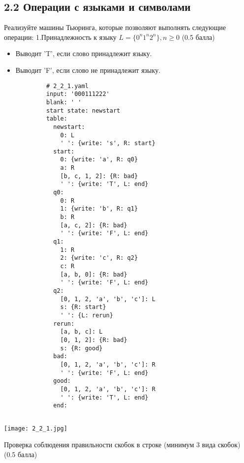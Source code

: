 \documentclass[a4paper,12pt]{article}
\begin{document}
        \subsection*{2.2 Операции с языками и символами}
        Реализуйте машины Тьюринга, которые позволяют выполнять следующие операции:\newline
        1.Принадлежность к языку $L = \{ 0^n1^n2^n \}, n \ge 0$ (0.5 балла)\newline
        \begin{itemize}
            \item Выводит 'T', если слово принадлежит языку.
            \item Выводит 'F', если слово не принадлежит языку.
        \end{itemize}
        \begin{verbatim}
            # 2_2_1.yaml
            input: '000111222'
            blank: ' '
            start state: newstart
            table:
              newstart:
                0: L
                ' ': {write: 's', R: start}
              start:
                0: {write: 'a', R: q0}
                a: R
                [b, c, 1, 2]: {R: bad}
                ' ': {write: 'T', L: end}
              q0:
                0: R
                1: {write: 'b', R: q1}
                b: R
                [a, c, 2]: {R: bad}
                ' ': {write: 'F', L: end}
              q1:
                1: R
                2: {write: 'c', R: q2}
                c: R
                [a, b, 0]: {R: bad}
                ' ': {write: 'F', L: end}
              q2:
                [0, 1, 2, 'a', 'b', 'c']: L
                s: {R: start}
                ' ': {L: rerun}
              rerun:
                [a, b, c]: L
                [0, 1, 2]: {R: bad}
                s: {R: good}
              bad:
                [0, 1, 2, 'a', 'b', 'c']: R
                ' ': {write: 'F', L: end}
              good:
                [0, 1, 2, 'a', 'b', 'c']: R
                ' ': {write: 'T', L: end}
              end:
    

        \end{verbatim}
        \begin{center}
            \texttt{[image: 2\_2\_1.jpg]} \\
        \end{center}
        Проверка соблюдения правильности скобок в строке (минимум 3 вида скобок) (0.5 балла)
\end{document}
